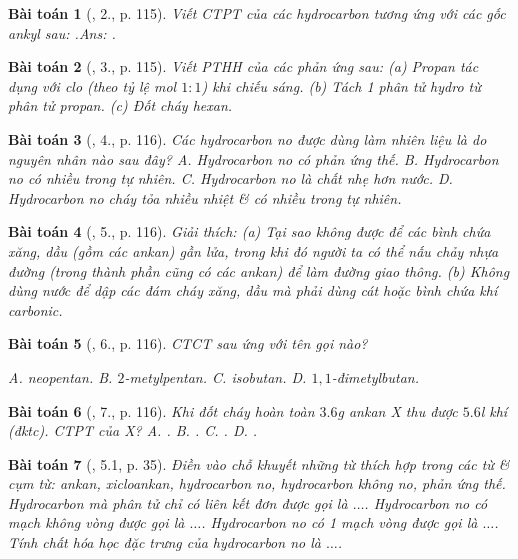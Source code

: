 \documentclass{article}
\newtheorem{baitoan}{Bài toán}
\begin{document}
\begin{baitoan}[\cite{SGK_Hoa_Hoc_11_co_ban}, 2., p. 115]
	Viết CTPT của các hydrocarbon tương ứng với các gốc ankyl sau: \emph{}.\hfill{\sf Ans:} \emph{.}
\end{baitoan}

\begin{baitoan}[\cite{SGK_Hoa_Hoc_11_co_ban}, 3., p. 115]
	Viết PTHH của các phản ứng sau: (a) Propan tác dụng với clo (theo tỷ lệ mol $1:1$) khi chiếu sáng. (b) Tách 1 phân tử hydro từ phân tử propan. (c) Đốt cháy hexan.
\end{baitoan}

\begin{baitoan}[\cite{SGK_Hoa_Hoc_11_co_ban}, 4., p. 116]
	Các hydrocarbon no được dùng làm nhiên liệu là do nguyên nhân nào sau đây? {\sf A.} Hydrocarbon no có phản ứng thế. {\sf B.} Hydrocarbon no có nhiều trong tự nhiên. {\sf C.} Hydrocarbon no là chất nhẹ hơn nước. {\sf D.} Hydrocarbon no cháy tỏa nhiều nhiệt \& có nhiều trong tự nhiên. 
\end{baitoan}

\begin{baitoan}[\cite{SGK_Hoa_Hoc_11_co_ban}, 5., p. 116]
	Giải thích: (a) Tại sao không được để các bình chứa xăng, dầu (gồm các ankan) gần lửa, trong khi đó người ta có thể nấu chảy nhựa đường (trong thành phần cũng có các ankan) để làm đường giao thông. (b) Không dùng nước để dập các đám cháy xăng, dầu mà phải dùng cát hoặc bình chứa khí carbonic.
\end{baitoan}

\begin{baitoan}[\cite{SGK_Hoa_Hoc_11_co_ban}, 6., p. 116]
	CTCT sau ứng với tên gọi nào?
	\begin{center}
	\end{center}
	{\sf A.} neopentan. {\sf B.} $2$-metylpentan. {\sf C.} isobutan. {\sf D.} $1,1$-đimetylbutan.
\end{baitoan}

\begin{baitoan}[\cite{SGK_Hoa_Hoc_11_co_ban}, 7., p. 116]
	Khi đốt cháy hoàn toàn $3.6$\emph{g} ankan X thu được $5.6$\emph{l} khí \emph{} (đktc). CTPT của X? {\sf A.} \emph{}. {\sf B.} \emph{}. {\sf C.} \emph{}. {\sf D.} \emph{}. 
\end{baitoan}

\begin{baitoan}[\cite{SBT_Hoa_Hoc_11_co_ban}, 5.1, p. 35]
	Điền vào chỗ khuyết những từ thích hợp trong các từ \& cụm từ: \emph{ankan, xicloankan, hydrocarbon no, hydrocarbon không no, phản ứng thế}. Hydrocarbon mà phân tử chỉ có liên kết đơn được gọi là $\ldots$. Hydrocarbon no có mạch không vòng được gọi là $\ldots$. Hydrocarbon no có 1 mạch vòng được gọi là $\ldots$. Tính chất hóa học đặc trưng của hydrocarbon no là $\ldots$.
\end{baitoan}
\end{document}
